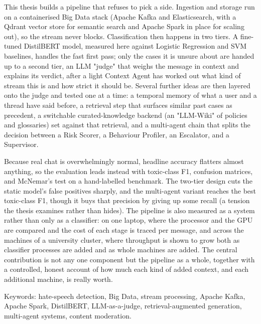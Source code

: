 \documentclass[11pt,a4paper]{report}
\begin{document}
This thesis builds a pipeline that refuses to pick a side. Ingestion and storage run on a containerised Big Data stack (Apache Kafka and Elasticsearch, with a Qdrant vector store for semantic search and Apache Spark in place for scaling out), so the stream never blocks. Classification then happens in two tiers. A fine-tuned DistilBERT model, measured here against Logistic Regression and SVM baselines, handles the fast first pass; only the cases it is unsure about are handed up to a second tier, an LLM "judge" that weighs the message in context and explains its verdict, after a light Context Agent has worked out what kind of stream this is and how strict it should be. Several further ideas are then layered onto the judge and tested one at a time: a temporal memory of what a user and a thread have said before, a retrieval step that surfaces similar past cases as precedent, a switchable curated-knowledge backend (an "LLM-Wiki" of policies and glossaries) set against that retrieval, and a multi-agent chain that splits the decision between a Risk Scorer, a Behaviour Profiler, an Escalator, and a Supervisor.

Because real chat is overwhelmingly normal, headline accuracy flatters almost anything, so the evaluation leads instead with toxic-class F1, confusion matrices, and McNemar's test on a hand-labelled benchmark. The two-tier design cuts the static model's false positives sharply, and the multi-agent variant reaches the best toxic-class F1, though it buys that precision by giving up some recall (a tension the thesis examines rather than hides). The pipeline is also measured as a system rather than only as a classifier: on one laptop, where the processor and the GPU are compared and the cost of each stage is traced per message, and across the machines of a university cluster, where throughput is shown to grow both as classifier processes are added and as whole machines are added. The central contribution is not any one component but the pipeline as a whole, together with a controlled, honest account of how much each kind of added context, and each additional machine, is really worth.

Keywords: hate-speech detection, Big Data, stream processing, Apache Kafka, Apache Spark, DistilBERT, LLM-as-a-judge, retrieval-augmented generation, multi-agent systems, content moderation.
\clearpage

\tableofcontents
\listoffigures
\listoftables
\clearpage









\appendix





\end{document}
